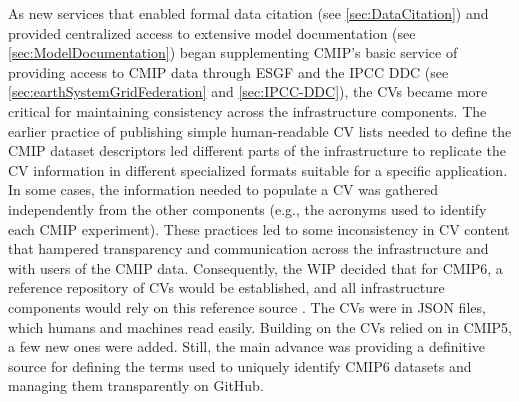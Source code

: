 \documentclass[gmd, preprint]{copernicus}
\begin{document}
As new services that enabled formal data citation (see \autoref{sec:DataCitation}) and provided centralized access to extensive model documentation (see \autoref{sec:ModelDocumentation}) began supplementing CMIP's basic service of providing access to CMIP data through ESGF and the IPCC DDC (see \autoref{sec:earthSystemGridFederation} and \autoref{sec:IPCC-DDC}), the CVs became more critical for maintaining consistency across the infrastructure components. The earlier practice of publishing simple human-readable CV lists needed to define the CMIP dataset descriptors led different parts of the infrastructure to replicate the CV information in different specialized formats suitable for a specific application. In some cases, the information needed to populate a CV was gathered independently from the other components (e.g., the acronyms used to identify each CMIP experiment). These practices led to some inconsistency in CV content that hampered transparency and communication across the infrastructure and with users of the CMIP data. Consequently, the WIP decided that for CMIP6, a reference repository of CVs would be established, and all infrastructure components would rely on this reference source \citep{durack_cmip6_2024}. The CVs were in JSON files, which humans and machines read easily. Building on the CVs relied on in CMIP5, a few new ones were added. Still, the main advance was providing a definitive source for defining the terms used to uniquely identify CMIP6 datasets and managing them transparently on GitHub.
\end{document}
